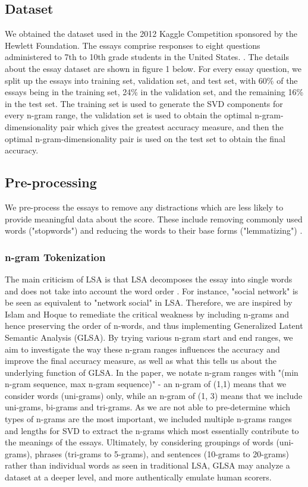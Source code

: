 \documentclass[10pt,letterpaper]{article}
\begin{document}
\subsection{Dataset}

We obtained the dataset used in the 2012 Kaggle Competition sponsored by the Hewlett Foundation. The essays comprise responses to eight questions administered to 7th to 10th grade students in the United States. \cite{hewlett2012aes}. The details about the essay dataset are shown in figure 1 below. For every essay question, we split up the essays into training set, validation set, and test set, with 60\% of the essays being in the training set, 24\% in the validation set, and the remaining 16\% in the test set. The training set is used to generate the SVD components for every n-gram range, the validation set is used to obtain the optimal n-gram-dimensionality pair which gives the greatest accuracy measure, and then the optimal n-gram-dimensionality pair is used on the test set to obtain the final accuracy.

\subsection{Pre-processing}

We pre-process the essays to remove any distractions which are less likely to provide meaningful data about the score. These include removing commonly used words ("stopwords") and reducing the words to their base forms ("lemmatizing") \cite{islam2010automated}.

\subsubsection{n-gram Tokenization}
The main criticism of LSA is that LSA decomposes the essay into single words and does not take into account the word order \cite{kintsch2002potential}. For instance, "social network" is be seen as equivalent to "network social" in LSA. Therefore, we are inspired by Islam and Hoque to remediate the critical weakness by including n-grams and hence preserving the order of n-words, and thus implementing Generalized Latent Semantic Analysis (GLSA). By trying various n-gram start and end ranges, we aim to investigate the way these n-gram ranges influences the accuracy and improve the final accuracy measure, as well as what this tells us about the underlying function of GLSA. In the paper, we notate n-gram ranges with "(min n-gram sequence, max n-gram sequence)" - an n-gram of (1,1) means that we consider words (uni-grams) only, while an n-gram of (1, 3) means that we include uni-grams, bi-grams and tri-grams. As we are not able to pre-determine which types of n-grams are the most important, we included multiple n-grams ranges and lengths for SVD to extract the n-grams which most essentially contribute to the meanings of the essays. Ultimately, by considering groupings of words (uni-grams), phrases (tri-grams to 5-grams), and sentences (10-grams to 20-grams) rather than individual words as seen in traditional LSA, GLSA may analyze a dataset at a deeper level, and more authentically emulate human scorers. 
\end{document}
